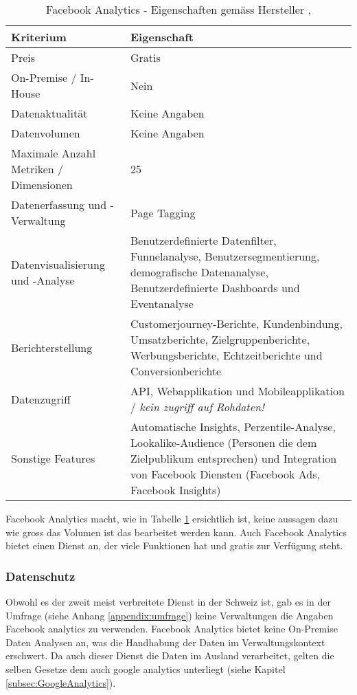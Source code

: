 \begin{table}[h]
	\centering
	\begin{tabular}{ | p{4cm} | p{10cm} |}
		\hline
		\textbf{Kriterium} & \textbf{Eigenschaft}  \\ 
		\hline
    Preis & Gratis \\
    \hline
    On-Premise / In-House & Nein \\
    \hline
    Datenaktualität & Keine Angaben \\
    \hline
		Datenvolumen & Keine Angaben \\
    \hline
    Maximale Anzahl Metriken / Dimensionen & 25 \\
    \hline
		Datenerfassung und -Verwaltung &  Page Tagging \\
    \hline
    Datenvisualisierung und -Analyse & Benutzerdefinierte Datenfilter, Funnelanalyse, Benutzersegmentierung,  demografische Datenanalyse, Benutzerdefinierte Dashboards und Eventanalyse \\
    \hline
    Berichterstellung & Customerjourney-Berichte, Kundenbindung, Umsatzberichte, Zielgruppenberichte, Werbungsberichte, Echtzeitberichte und Conversionberichte \\
    \hline
    Datenzugriff & API, Webapplikation und Mobileapplikation / \textit{kein zugriff auf Rohdaten!}\\
    \hline
    Sonstige Features & Automatische Insights, Perzentile-Analyse, Lookalike-Audience (Personen die dem Zielpublikum entsprechen) und Integration von Facebook Diensten (Facebook Ads, Facebook Insights) \\
		\hline  
	\end{tabular}
	\caption{Facebook Analytics - Eigenschaften gemäss Hersteller \parencite{facebookAnalyticsFeatures}, \parencite{facebookAnalyticsHelp}}
	\label{tab: facebookAnalyticsFeatures}
\end{table}

Facebook Analytics macht, wie in Tabelle \ref{tab: facebookAnalyticsFeatures} ersichtlich ist, keine aussagen dazu wie gross das Volumen ist das bearbeitet werden kann. 
Auch Facebook Analytics bietet einen Dienst an, der viele Funktionen hat und gratis zur Verfügung steht. 

\subsubsection{Datenschutz}
Obwohl es der zweit meist verbreitete Dienst in der Schweiz ist, gab es in der Umfrage (siehe Anhang \ref{appendix:umfrage}) keine Verwaltungen die Angaben Facebook analytics zu verwenden. Facebook Analytics bietet keine On-Premise Daten Analysen an, was die Handhabung der Daten im Verwaltungskontext erschwert. Da auch dieser Dienst die Daten im Ausland verarbeitet, gelten die selben Gesetze dem auch google analytics unterliegt (siehe Kapitel \ref{subsec:GoogleAnalytics}). 

